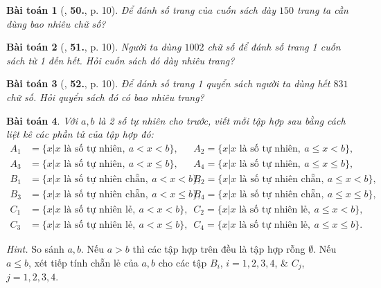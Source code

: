 \documentclass{article}
\numberwithin{equation}{section}
\newtheorem{baitoan}{Bài toán}[section]
\begin{document}
\begin{baitoan}[\cite{Trong_Toan_6_2021}, \textbf{50.}, p. 10]
	Để đánh số trang của cuốn sách dày $150$ trang ta cần dùng bao nhiêu chữ số?
\end{baitoan}

\begin{baitoan}[\cite{Trong_Toan_6_2021}, \textbf{51.}, p. 10]
	Người ta dùng $1002$ chữ số để đánh số trang 1 cuốn sách từ 1 đến hết. Hỏi cuốn sách đó dày nhiêu trang?
\end{baitoan}

\begin{baitoan}[\cite{Trong_Toan_6_2021}, \textbf{52.}, p. 10]
	Để đánh số trang 1 quyển sách người ta dùng hết $831$ chữ số. Hỏi quyển sách đó có bao nhiêu trang?
\end{baitoan}

\begin{baitoan}
	Với $a,b$ là 2 số tự nhiên cho trước, viết mỗi tập hợp sau bằng cách liệt kê các phần tử của tập hợp đó:
	\begin{align*}
		A_1 &= \{x|x\mbox{ là số tự nhiên},\ a < x < b\},\ &&A_2 = \{x|x\mbox{ là số tự nhiên},\ a\le x < b\},\\
		A_3 &= \{x|x\mbox{ là số tự nhiên},\ a < x\le b\},\ &&A_4 = \{x|x\mbox{ là số tự nhiên},\ a\le x\le b\},\\
		B_1 &= \{x|x\mbox{ là số tự nhiên chẵn},\ a < x < b\},\ &&B_2 = \{x|x\mbox{ là số tự nhiên chẵn},\ a\le x < b\},\\
		B_3 &= \{x|x\mbox{ là số tự nhiên chẵn},\ a < x\le b\},\ &&B_4 = \{x|x\mbox{ là số tự nhiên chẵn},\ a\le x\le b\},\\
		C_1 &= \{x|x\mbox{ là số tự nhiên lẻ},\ a < x < b\},\ &&C_2 = \{x|x\mbox{ là số tự nhiên lẻ},\ a\le x < b\},\\ C_3 &= \{x|x\mbox{ là số tự nhiên lẻ},\ a < x\le b\},\ &&C_4 = \{x|x\mbox{ là số tự nhiên lẻ},\ a\le x\le b\}.
	\end{align*}
\end{baitoan}
\textit{Hint.} So sánh $a,b$. Nếu $a > b$ thì các tập hợp trên đều là tập hợp rỗng $\emptyset$. Nếu $a\le b$, xét tiếp tính chẵn lẻ của $a,b$ cho các tập $B_i$, $i = 1,2,3,4$, \& $C_j$, $j = 1,2,3,4$.
\end{document}
